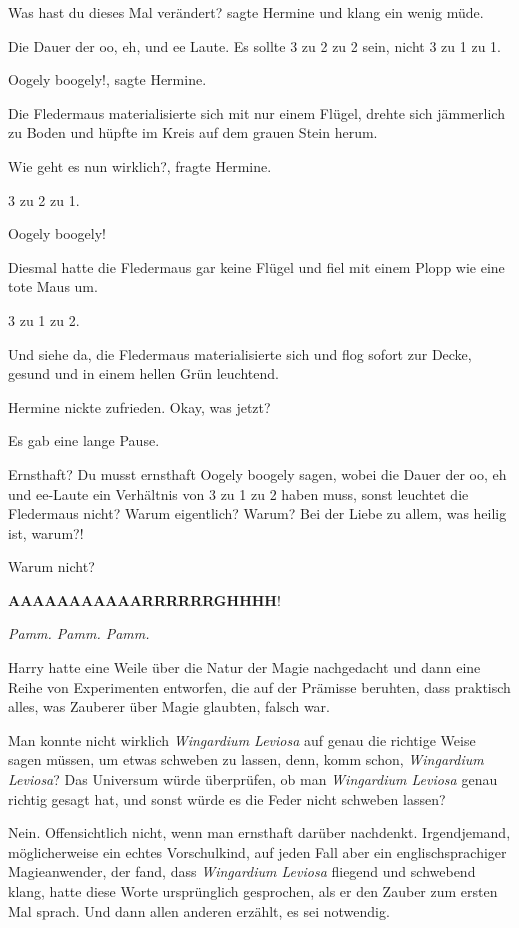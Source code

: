 \glqq{}Was hast du dieses Mal verändert?\grqq{} sagte Hermine und klang ein wenig
müde.

\glqq{}Die Dauer der oo, eh, und ee Laute. Es sollte 3 zu 2 zu 2 sein, nicht 3 zu
1 zu 1.\grqq{}

\glqq{}Oogely boogely!\grqq{}, sagte Hermine.

Die Fledermaus materialisierte sich mit nur einem Flügel, drehte sich jämmerlich
zu Boden und hüpfte im Kreis auf dem grauen Stein herum.

\glqq{}Wie geht es nun wirklich?\grqq{}, fragte Hermine.

\glqq{}3 zu 2 zu 1.\grqq{}

\glqq{}Oogely boogely!\grqq{}

Diesmal hatte die Fledermaus gar keine Flügel und fiel mit einem Plopp wie eine
tote Maus um.

\glqq{}3 zu 1 zu 2.\grqq{}

Und siehe da, die Fledermaus materialisierte sich und flog sofort zur Decke,
gesund und in einem hellen Grün leuchtend.

Hermine nickte zufrieden. \glqq{}Okay, was jetzt?\grqq{}

Es gab eine lange Pause.

\glqq{}Ernsthaft? Du musst ernsthaft Oogely boogely sagen, wobei die Dauer der
oo, eh und ee-Laute ein Verhältnis von 3 zu 1 zu 2 haben muss, sonst leuchtet
die Fledermaus nicht? Warum eigentlich? Warum? Bei der Liebe zu allem, was
heilig ist, warum?!\grqq{}

\glqq{}Warum nicht?\grqq{}

\glqq{}\textbf{AAAAAAAAAAARRRRRRGHHHH}!\grqq{}

\emph{Pamm. Pamm. Pamm.}

Harry hatte eine Weile über die Natur der Magie nachgedacht und dann eine Reihe
von Experimenten entworfen, die auf der Prämisse beruhten, dass praktisch alles,
was Zauberer über Magie glaubten, falsch war.

Man konnte nicht wirklich \emph{\glqq{}Wingardium Leviosa\grqq{}} auf genau die
richtige Weise sagen müssen, um etwas schweben zu lassen, denn, komm schon,
\emph{\glqq{}Wingardium Leviosa\grqq{}}? Das Universum würde überprüfen, ob man
\emph{\glqq{}Wingardium Leviosa\grqq{}} genau richtig gesagt hat, und sonst
würde es die Feder nicht schweben lassen?

Nein. Offensichtlich nicht, wenn man ernsthaft darüber nachdenkt. Irgendjemand,
möglicherweise ein echtes Vorschulkind, auf jeden Fall aber ein
englischsprachiger Magieanwender, der fand, dass \emph{\glqq{}Wingardium
Leviosa\grqq{}} fliegend und schwebend klang, hatte diese Worte ursprünglich
gesprochen, als er den Zauber zum ersten Mal sprach. Und dann allen anderen
erzählt, es sei notwendig.

